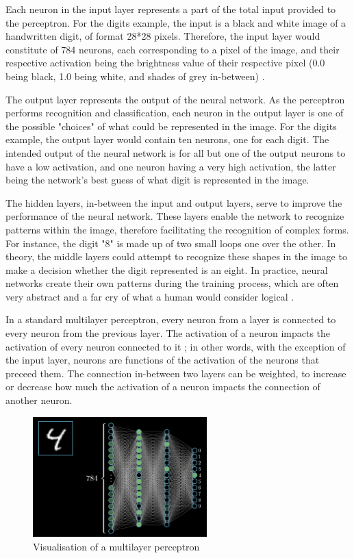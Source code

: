 \documentclass[12pt,a4paper,notitlepage]{article}
\begin{document}
Each neuron in the input layer represents a part of the total input provided to the perceptron. For the digits example, the input is a black and white image of a handwritten digit, of format 28*28 pixels. Therefore, the input layer would constitute of 784 neurons, each corresponding to a pixel of the image, and their respective activation being the brightness value of their respective pixel (0.0 being black, 1.0 being white, and shades of grey in-between) \cite{sanderson_but_2017}.

The output layer represents the output of the neural network. As the perceptron performs recognition and classification, each neuron in the output layer is one of the possible "choices" of what could be represented in the image. For the digits example, the output layer would contain ten neurons, one for each digit. The intended output of the neural network is for all but one of the output neurons to have a low activation, and one neuron having a very high activation, the latter being the network's best guess of what digit is represented in the image.

The hidden layers, in-between the input and output layers, serve to improve the performance of the neural network. These layers enable the network to recognize patterns within the image, therefore facilitating the recognition of complex forms. For instance, the digit "8" is made up of two small loops one over the other. In theory, the middle layers could attempt to recognize these shapes in the image to make a decision whether the digit represented is an eight. In practice, neural networks create their own patterns during the training process, which are often very abstract and a far cry of what a human would consider logical \cite{sanderson_gradient_2017}.

In a standard multilayer perceptron, every neuron from a layer is connected to every neuron from the previous layer. The activation of a neuron impacts the activation of every neuron connected to it ; in other words, with the exception of the input layer, neurons are functions of the activation of the neurons that preceed them. The connection in-between two layers can be weighted, to increase or decrease how much the activation of a neuron impacts the connection of another neuron.

\begin{figure}[htbp]
	\centering
		\includegraphics[width=0.60\textwidth]{images/perceptron-visualisation.png}
	\caption{Visualisation of a multilayer perceptron \cite{sanderson_gradient_2017}}
	\label{fig:perceptron-visualisation}
\end{figure}
\end{document}
